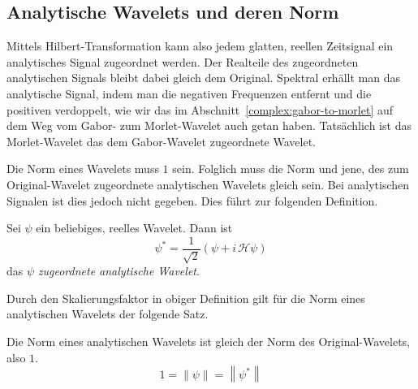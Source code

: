 \subsection{Analytische Wavelets und deren Norm}

Mittels Hilbert-Transformation kann also jedem glatten, reellen Zeitsignal ein analytisches Signal zugeordnet werden.
Der Realteile des zugeordneten analytischen Signals bleibt dabei gleich dem Original.
Spektral erhällt man das analytische Signal, indem man die negativen Frequenzen entfernt und die positiven verdoppelt, wie wir das im Abschnitt~\ref{complex:gabor-to-morlet} auf dem Weg vom Gabor- zum Morlet-Wavelet auch getan haben.
Tatsächlich ist das Morlet-Wavelet das dem Gabor-Wavelet zugeordnete Wavelet.

Die Norm eines Wavelets muss $1$ sein.
Folglich muss die Norm und jene, des zum Original-Wavelet zugeordnete analytischen Wavelets gleich sein.
Bei analytischen Signalen ist dies jedoch nicht gegeben.
Dies führt zur folgenden Definition.
\begin{definition}
	Sei $\psi$ ein beliebiges, reelles Wavelet. Dann ist
	\begin{equation}
		\psi^\ast = \frac{1}{\sqrt{2}}\left(\psi + i\,\mathcal{H}\psi\right) \label{complex:anawave}
	\end{equation}
	das $\psi$ \emph{zugeordnete analytische Wavelet}.
\end{definition}

Durch den Skalierungsfaktor in obiger Definition gilt für die Norm eines analytischen Wavelets der folgende Satz.
\begin{satz}
	\label{complex:norm}
	Die Norm eines analytischen Wavelets ist gleich der Norm des Original-Wavelets, also $1$.
	\[1 = \left\|\psi\right\| = \left\|\psi^\ast\right\|\]
\end{satz}

